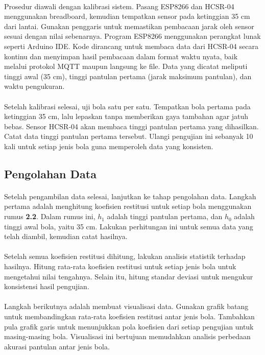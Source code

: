 \paragraph{}Prosedur diawali dengan kalibrasi sistem. Pasang ESP8266 dan HCSR-04 menggunakan breadboard, kemudian tempatkan sensor pada ketinggian 35 cm dari lantai. Gunakan penggaris untuk memastikan pembacaan jarak oleh sensor sesuai dengan nilai sebenarnya. Program ESP8266 menggunakan perangkat lunak seperti Arduino IDE. Kode dirancang untuk membaca data dari HCSR-04 secara kontinu dan menyimpan hasil pembacaan dalam format waktu nyata, baik melalui protokol MQTT maupun langsung ke file. Data yang dicatat meliputi tinggi awal (35 cm), tinggi pantulan pertama (jarak maksimum pantulan), dan waktu pengukuran.

\paragraph{}Setelah kalibrasi selesai, uji bola satu per satu. Tempatkan bola pertama pada ketinggian 35 cm, lalu lepaskan tanpa memberikan gaya tambahan agar jatuh bebas. Sensor HCSR-04 akan membaca tinggi pantulan pertama yang dihasilkan. Catat data tinggi pantulan pertama tersebut. Ulangi pengujian ini sebanyak 10 kali untuk setiap jenis bola guna memperoleh data yang konsisten.

\subsection{Pengolahan Data}
\paragraph{}Setelah pengambilan data selesai, lanjutkan ke tahap pengolahan data. Langkah pertama adalah menghitung koefisien restitusi untuk setiap bola menggunakan rumus \textbf{2.2}. Dalam rumus ini, \( h_1 \) adalah tinggi pantulan pertama, dan \( h_0 \) adalah tinggi awal bola, yaitu 35 cm. Lakukan perhitungan ini untuk semua data yang telah diambil, kemudian catat hasilnya.
\paragraph{}Setelah semua koefisien restitusi dihitung, lakukan analisis statistik terhadap hasilnya. Hitung rata-rata koefisien restitusi untuk setiap jenis bola untuk mengetahui nilai tengahnya. Selain itu, hitung standar deviasi untuk mengukur konsistensi hasil pengujian.
\paragraph{}Langkah berikutnya adalah membuat visualisasi data. Gunakan grafik batang untuk membandingkan rata-rata koefisien restitusi antar jenis bola. Tambahkan pula grafik garis untuk menunjukkan pola koefisien dari setiap pengujian untuk masing-masing bola. Visualisasi ini bertujuan memudahkan analisis perbedaan akurasi pantulan antar jenis bola.
